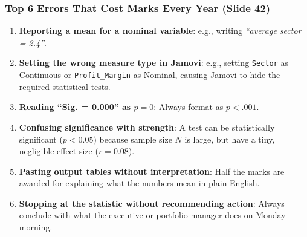 \documentclass[
]{article}
\providecommand{\tightlist}{%
  \setlength{\itemsep}{0pt}\setlength{\parskip}{0pt}}
\begin{document}
\subsubsection{Top 6 Errors That Cost Marks Every Year (Slide
42)}\label{top-6-errors-that-cost-marks-every-year-slide-42}

\begin{enumerate}
\def\labelenumi{\arabic{enumi}.}
\tightlist
\item
  \textbf{Reporting a mean for a nominal variable}: e.g., writing
  \emph{``average sector = 2.4''}.
\item
  \textbf{Setting the wrong measure type in Jamovi}: e.g., setting
  \texttt{Sector} as Continuous or \texttt{Profit\_Margin} as Nominal,
  causing Jamovi to hide the required statistical tests.
\item
  \textbf{Reading ``Sig. = 0.000'' as \(p = 0\)}: Always format as
  \textbf{\(p < .001\)}.
\item
  \textbf{Confusing significance with strength}: A test can be
  statistically significant (\(p < 0.05\)) because sample size \(N\) is
  large, but have a tiny, negligible effect size (\(r = 0.08\)).
\item
  \textbf{Pasting output tables without interpretation}: Half the marks
  are awarded for explaining what the numbers mean in plain English.
\item
  \textbf{Stopping at the statistic without recommending action}: Always
  conclude with what the executive or portfolio manager does on Monday
  morning.
\end{enumerate}
\end{document}
